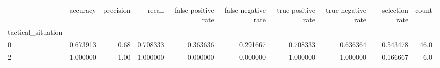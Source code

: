 \begin{tabular}{lrrrrrrrrr}
\toprule
{} &  accuracy &  precision &    recall &  false positive rate &  false negative rate &  true positive rate &  true negative rate &  selection rate &  count \\
tactical\_situation &           &            &           &                      &                      &                     &                     &                 &        \\
\midrule
0                  &  0.673913 &       0.68 &  0.708333 &             0.363636 &             0.291667 &            0.708333 &            0.636364 &        0.543478 &   46.0 \\
2                  &  1.000000 &       1.00 &  1.000000 &             0.000000 &             0.000000 &            1.000000 &            1.000000 &        0.166667 &    6.0 \\
\bottomrule
\end{tabular}
